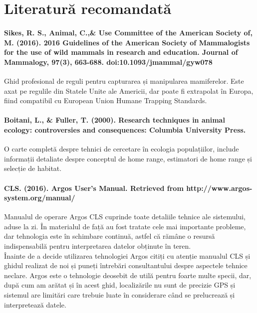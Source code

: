 \documentclass[11pt,onehalfspacing]{elife}
\begin{document}
\section{Literatură recomandată}

\paragraph{Sikes, R. S., Animal, C.,\& Use Committee of the American Society of, M. (2016). 2016 Guidelines of the American Society of Mammalogists for the use of wild mammals in research and education. Journal of Mammalogy, 97(3), 663-688. doi:10.1093/jmammal/gyw078}

Ghid profesional de reguli pentru capturarea și manipularea mamiferelor. Este axat pe regulile din Statele Unite ale Americii, dar poate fi extrapolat în Europa, fiind compatibil cu European Union Humane Trapping Standards.

\paragraph{Boitani, L., \& Fuller, T. (2000). Research techniques in animal ecology: controversies and consequences: Columbia University Press.}

O carte completă despre tehnici de cercetare în ecologia populațiilor, include informații detaliate despre conceptul de home range, estimatori de home range și selecție de habitat.

\paragraph{CLS. (2016). Argos User's Manual. Retrieved from http://www.argos-system.org/manual/}

Manualul de operare Argos CLS cuprinde toate detaliile tehnice ale sistemului, aduse la zi. În materialul de față au fost tratate cele mai importante probleme, dar tehnologia este în schimbare continuă, astfel că rămâne o resursă indispensabilă pentru interpretarea datelor obținute în teren.\\ 
Înainte de a decide utilizarea tehnologiei Argos citiți cu atenție manualul CLS și ghidul realizat de noi și puneți întrebări consultantului despre aspectele tehnice neclare. Argos este o tehnologie deosebit de utilă pentru foarte multe specii, dar, după cum am arătat și în acest ghid, localizările nu sunt de precizie GPS și sistemul are limitări care trebuie luate în considerare când se prelucrează și interpretează datele.
\end{document}
